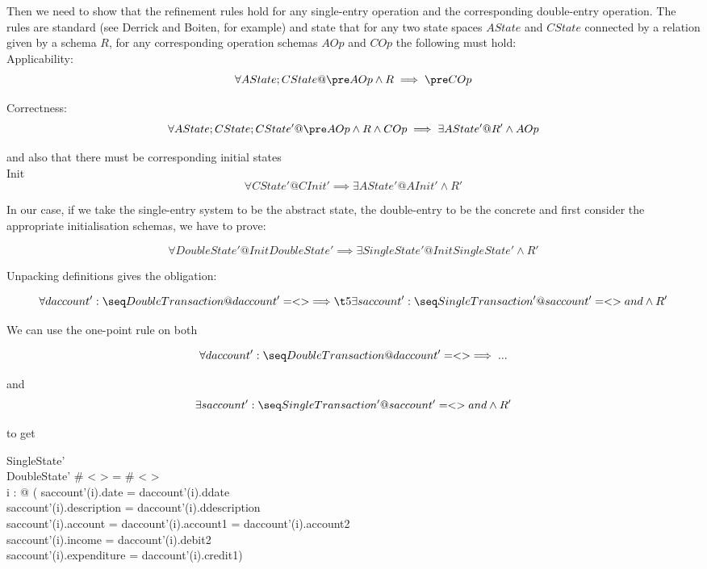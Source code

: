\documentclass[11pt]{amsart}
\begin{document}
Then we need to show that the refinement rules hold for any single-entry operation and the  corresponding double-entry operation. The rules are standard (see Derrick and Boiten, for example) and state that for any two state spaces $AState$ and $CState$ connected by a relation given by a schema $R$, for any corresponding operation schemas $AOp$ and $COp$ the following must hold:\\

\noindent Applicability:
\[
\forall AState; CState @ \pre AOp \land R \implies \pre COp
\]

\noindent Correctness:
\[
\forall AState; CState; CState' @ \pre AOp \land R \land COp \implies \exists AState' @ R' \land AOp
\]

\noindent and also that there must be corresponding initial states\\

\noindent Init
\[
\forall CState' @ CInit' \implies \exists AState' @ AInit' \land R'
\]

In our case, if we take the single-entry system to be the abstract state, the double-entry to be the concrete and first consider the appropriate initialisation schemas, we have to prove:

\[
\forall DoubleState'  @ InitDoubleState' \implies \exists SingleState'  @ InitSingleState' \land R'
\]

Unpacking definitions gives the obligation:

\[
\forall daccount' : \seq DoubleTransaction @ daccount' = < > \implies\\
\t5 \exists saccount' : \seq SingleTransaction' @ saccount' = < > and \land R'
\]

We can use the one-point rule on both

\[
\forall daccount' : \seq DoubleTransaction @ daccount' = < > \implies...
\]

and
\[
\exists saccount' : \seq SingleTransaction' @ saccount' = < > and \land R'
\]

to get

\begin{schema}{}
SingleState'\\
DoubleState'
\where
\# < > = \# < >\\
\forall i : \dom < > @ (
saccount'(i).date = daccount'(i).ddate \land\\
saccount'(i).description = daccount'(i).ddescription \land\\
saccount'(i).account = daccount'(i).account1 = daccount'(i).account2 \land\\
saccount'(i).income = daccount'(i).debit2 \land\\
saccount'(i).expenditure = daccount'(i).credit1)
\end{schema}
\end{document}
